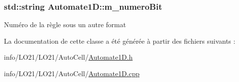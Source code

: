 \subsubsection[{\texorpdfstring{m\+\_\+numero\+Bit}{m_numeroBit}}]{\setlength{\rightskip}{0pt plus 5cm}std\+::string Automate1\+D\+::m\+\_\+numero\+Bit\hspace{0.3cm}{\ttfamily [private]}}\hypertarget{class_automate1_d_a2a7ec50a64371b8b5dacd49844b712e3}{}\label{class_automate1_d_a2a7ec50a64371b8b5dacd49844b712e3}
Numéro de la règle sous un autre format 

La documentation de cette classe a été générée à partir des fichiers suivants \+:\begin{DoxyCompactItemize}
\item 
info/\+L\+O21/\+L\+O21/\+Auto\+Cell/\hyperlink{_automate1_d_8h}{Automate1\+D.\+h}\item 
info/\+L\+O21/\+L\+O21/\+Auto\+Cell/\hyperlink{_automate1_d_8cpp}{Automate1\+D.\+cpp}\end{DoxyCompactItemize}
